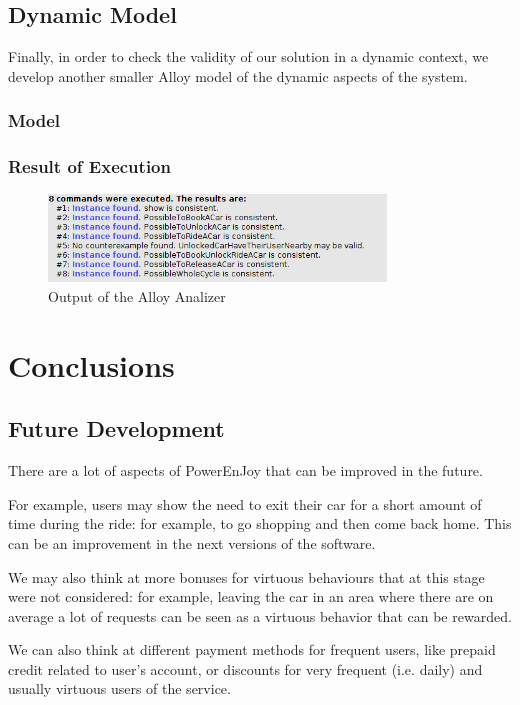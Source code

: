 \documentclass[11pt]{article} %
\newcommand{\pe}{PowerEnJoy }
\begin{document}
\subsection{Dynamic Model}

Finally, in order to check the validity of our solution in a dynamic context, we develop another smaller Alloy model of the dynamic aspects of the system.

\subsubsection{Model}


\subsubsection{Result of Execution}
\begin{figure}[H]
	\centering
	\includegraphics[width=0.8\textwidth]{Alloy/DynamicConsistent.png}
	\caption{Output of the Alloy Analizer}
\end{figure}

\newpage
\section{Conclusions}

\subsection{Future Development}
There are a lot of aspects of \pe that can be improved in the future.

For example, users may show the need to exit their car for a short amount of time during the ride: for example, to go shopping and then come back home. This can be an improvement in the next versions of the software.

We may also think at more bonuses for virtuous behaviours that at this stage were not considered: for example, leaving the car in an area where there are on average a lot of requests can be seen as a virtuous behavior that can be rewarded.

We can also think at different payment methods for frequent users, like prepaid credit related to user's account, or discounts for very frequent (i.e. daily) and usually virtuous users of the service.
\end{document}
